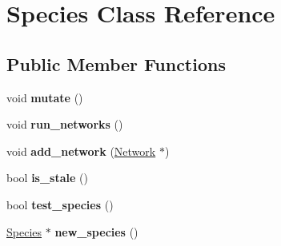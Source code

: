 \hypertarget{classSpecies}{}\section{Species Class Reference}
\label{classSpecies}
\subsection*{Public Member Functions}
\begin{DoxyCompactItemize}
\item 
void {\bfseries mutate} ()\hypertarget{classSpecies_ab4c037683307c828083dde00cd7e673d}{}\label{classSpecies_ab4c037683307c828083dde00cd7e673d}

\item 
void {\bfseries run\+\_\+networks} ()\hypertarget{classSpecies_ae79d188cf5cb0ef1d6b82e44632ebf94}{}\label{classSpecies_ae79d188cf5cb0ef1d6b82e44632ebf94}

\item 
void {\bfseries add\+\_\+network} (\hyperlink{classNetwork}{Network} $\ast$)\hypertarget{classSpecies_a85517a1d67aad99838e5bfbe9f920aa0}{}\label{classSpecies_a85517a1d67aad99838e5bfbe9f920aa0}

\item 
bool {\bfseries is\+\_\+stale} ()\hypertarget{classSpecies_a716e5737f0367dc4f908bab1e47cf5ac}{}\label{classSpecies_a716e5737f0367dc4f908bab1e47cf5ac}

\item 
bool {\bfseries test\+\_\+species} ()\hypertarget{classSpecies_ad8a5df4740c1a7ac43d2f4d6e47a8092}{}\label{classSpecies_ad8a5df4740c1a7ac43d2f4d6e47a8092}

\item 
\hyperlink{classSpecies}{Species} $\ast$ {\bfseries new\+\_\+species} ()\hypertarget{classSpecies_ad8caa0f1a2c1655483240591512a1065}{}\label{classSpecies_ad8caa0f1a2c1655483240591512a1065}

\end{DoxyCompactItemize}
